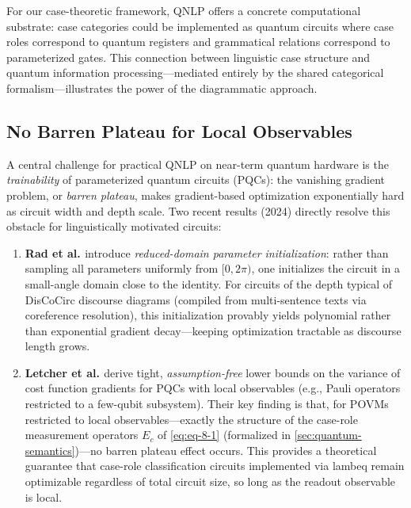 \documentclass[
]{article}
\begin{document}
For our case-theoretic framework, QNLP offers a concrete computational
substrate: case categories could be implemented as quantum circuits
where case roles correspond to quantum registers and grammatical
relations correspond to parameterized gates. This connection between
linguistic case structure and quantum information processing---mediated
entirely by the shared categorical formalism---illustrates the power of
the diagrammatic approach.

\subsection{No Barren Plateau for Local
Observables}\label{no-barren-plateau-for-local-observables}

A central challenge for practical QNLP on near-term quantum hardware is
the \emph{trainability} of parameterized quantum circuits (PQCs): the
vanishing gradient problem, or \emph{barren plateau}, makes
gradient-based optimization exponentially hard as circuit width and
depth scale. Two recent results (2024) directly resolve this obstacle
for linguistically motivated circuits:

\begin{enumerate}
\def\labelenumi{\arabic{enumi}.}
\item
  \textbf{Rad et al. \citeyearpar{rad2024trainability}} introduce
  \emph{reduced-domain parameter initialization}: rather than sampling
  all parameters uniformly from \([0, 2\pi)\), one initializes the
  circuit in a small-angle domain close to the identity. For circuits of
  the depth typical of DisCoCirc discourse diagrams (compiled from
  multi-sentence texts via coreference resolution), this initialization
  provably yields polynomial rather than exponential gradient
  decay---keeping optimization tractable as discourse length grows.
\item
  \textbf{Letcher et al. \citeyearpar{letcher2024tight}} derive tight,
  \emph{assumption-free} lower bounds on the variance of cost function
  gradients for PQCs with local observables (e.g., Pauli operators
  restricted to a few-qubit subsystem). Their key finding is that, for
  POVMs restricted to local observables---exactly the structure of the
  case-role measurement operators \(E_c\) of \autoref{eq:eq-8-1}
  (formalized in \autoref{sec:quantum-semantics})---no barren plateau
  effect occurs. This provides a theoretical guarantee that case-role
  classification circuits implemented via lambeq remain optimizable
  regardless of total circuit size, so long as the readout observable is
  local.
\end{enumerate}
\end{document}
